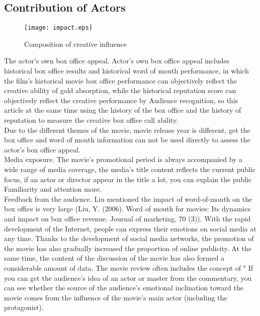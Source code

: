 \subsection{Contribution of Actors}
\begin{figure}[!htbp]
\centering
\texttt{[image: impact.eps]}
\caption{Composition of creative influence}
\label{fig:mhin}
\end{figure}
The actor's own box office appeal. Actor's own box office appeal includes historical box office results and historical word of mouth performance, in which the film's historical movie box office performance can objectively reflect the creative ability of gold absorption, while the historical reputation score can objectively reflect the creative performance by Audience recognition, so this article at the same time using the history of the box office and the history of reputation to measure the creative box office call ability.\\
Due to the different themes of the movie, movie release year is different, get the box office and word of mouth information can not be used directly to assess the actor's box office appeal.\\
Media exposure. The movie's promotional period is always accompanied by a wide range of media coverage, the media's title content reflects the current public focus, if an actor or director appear in the title a lot, you can explain the public Familiarity and attention more.\\
Feedback from the audience. Liu mentioned the impact of word-of-mouth on the box office is very large (Liu, Y. (2006). Word of mouth for movies: Its dynamics and impact on box office revenue. Journal of marketing, 70 (3)). With the rapid development of the Internet, people can express their emotions on social media at any time. Thanks to the development of social media networks, the promotion of the movie has also gradually increased the proportion of online publicity. At the same time, the content of the discussion of the movie has also formed a considerable amount of data. The movie review often includes the concept of " If you can get the audience's idea of ​​an actor or master from the commentary, you can see whether the source of the audience's emotional inclination toward the movie comes from the influence of the movie's main actor (including the protagonist).\\
